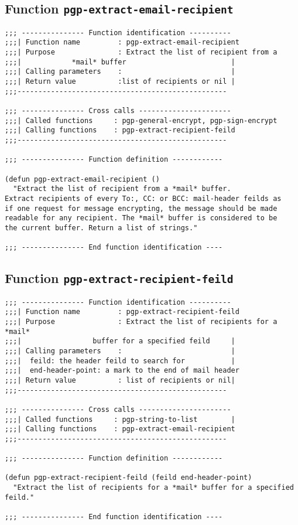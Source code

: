 \subsection{Function {\tt pgp-extract-email-recipient}}
\leavevmode
\begin{verbatim}
;;; --------------- Function identification ----------
;;;| Function name         : pgp-extract-email-recipient
;;;| Purpose               : Extract the list of recipient from a
;;;|            *mail* buffer                         |
;;;| Calling parameters    :                          |
;;;| Return value          :list of recipients or nil |
;;;--------------------------------------------------

;;; --------------- Cross calls ----------------------
;;;| Called functions     : pgp-general-encrypt, pgp-sign-encrypt
;;;| Calling functions    : pgp-extract-recipient-feild
;;;--------------------------------------------------

;;; --------------- Function definition ------------

(defun pgp-extract-email-recipient ()
  "Extract the list of recipient from a *mail* buffer.
Extract recipients of every To:, CC: or BCC: mail-header feilds as 
if one request for message encrypting, the message should be made 
readable for any recipient. The *mail* buffer is considered to be
the current buffer. Return a list of strings."

;;; --------------- End function identification ----
\end{verbatim}
\subsection{Function {\tt pgp-extract-recipient-feild}}
\leavevmode
\begin{verbatim}
;;; --------------- Function identification ----------
;;;| Function name         : pgp-extract-recipient-feild
;;;| Purpose               : Extract the list of recipients for a *mail*
;;;|                 buffer for a specified feild     |
;;;| Calling parameters    :                          |
;;;|  feild: the header feild to search for           |
;;;|  end-header-point: a mark to the end of mail header
;;;| Return value          : list of recipients or nil|
;;;--------------------------------------------------

;;; --------------- Cross calls ----------------------
;;;| Called functions     : pgp-string-to-list        |
;;;| Calling functions    : pgp-extract-email-recipient
;;;--------------------------------------------------

;;; --------------- Function definition ------------

(defun pgp-extract-recipient-feild (feild end-header-point)
  "Extract the list of recipients for a *mail* buffer for a specified feild."

;;; --------------- End function identification ----
\end{verbatim}
